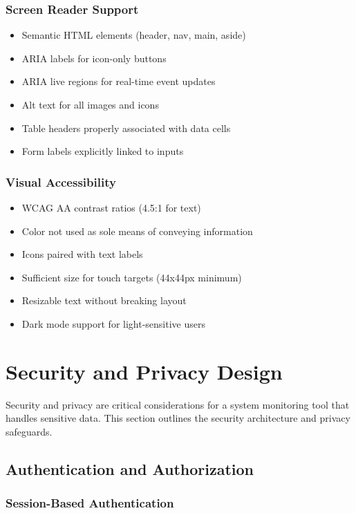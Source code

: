 \subsubsection{Screen Reader Support}

\begin{itemize}
    \item Semantic HTML elements (header, nav, main, aside)
    \item ARIA labels for icon-only buttons
    \item ARIA live regions for real-time event updates
    \item Alt text for all images and icons
    \item Table headers properly associated with data cells
    \item Form labels explicitly linked to inputs
\end{itemize}

\subsubsection{Visual Accessibility}

\begin{itemize}
    \item WCAG AA contrast ratios (4.5:1 for text)
    \item Color not used as sole means of conveying information
    \item Icons paired with text labels
    \item Sufficient size for touch targets (44x44px minimum)
    \item Resizable text without breaking layout
    \item Dark mode support for light-sensitive users
\end{itemize}

\section{Security and Privacy Design}

Security and privacy are critical considerations for a system monitoring tool that handles sensitive data. This section outlines the security architecture and privacy safeguards.

\subsection{Authentication and Authorization}

\subsubsection{Session-Based Authentication}


